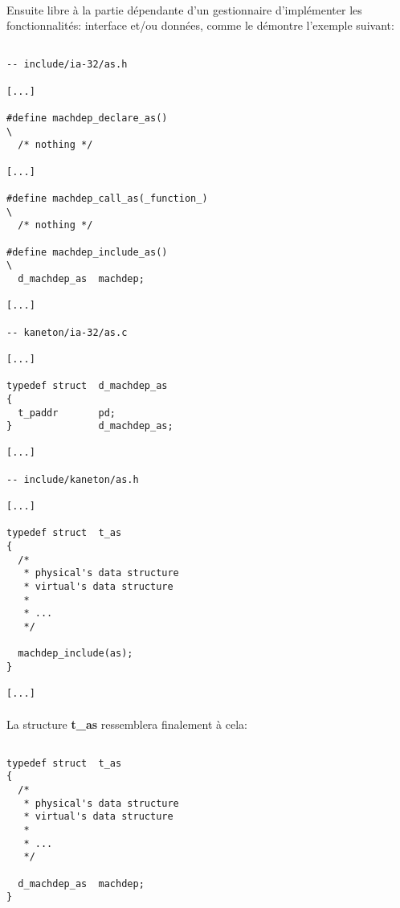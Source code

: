 \documentclass[10pt,a4wide]{article}
\begin{document}
\paragraph{}

Ensuite libre \`a la partie d\'ependante d'un gestionnaire d'impl\'ementer
les fonctionnalit\'es: interface et/ou donn\'ees, comme le d\'emontre
l'exemple suivant:

\begin{verbatim}

-- include/ia-32/as.h

[...]

#define machdep_declare_as()                                            \
  /* nothing */

[...]

#define machdep_call_as(_function_)                                     \
  /* nothing */

#define machdep_include_as()                                            \
  d_machdep_as  machdep;

[...]

-- kaneton/ia-32/as.c

[...]

typedef struct  d_machdep_as
{
  t_paddr       pd;
}               d_machdep_as;

[...]

-- include/kaneton/as.h

[...]

typedef struct  t_as
{
  /*
   * physical's data structure
   * virtual's data structure
   *
   * ...
   */

  machdep_include(as);
}

[...]

\end{verbatim}

\paragraph{}

La structure \textbf{t\_as} ressemblera finalement \`a cela:

\begin{verbatim}

typedef struct  t_as
{
  /*
   * physical's data structure
   * virtual's data structure
   *
   * ...
   */

  d_machdep_as  machdep;
}

\end{verbatim}
\end{document}
